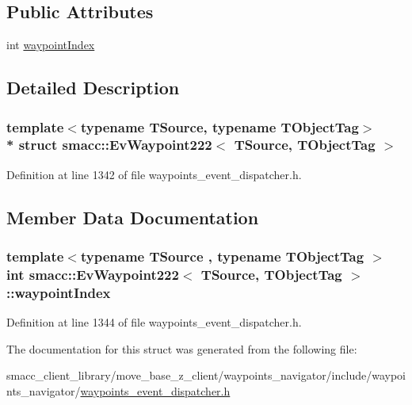 \subsection*{Public Attributes}
\begin{DoxyCompactItemize}
\item 
int \hyperlink{structsmacc_1_1EvWaypoint222_a71aa9cb162e393888c78ec0aecb1785b}{waypoint\+Index}
\end{DoxyCompactItemize}


\subsection{Detailed Description}
\subsubsection*{template$<$typename T\+Source, typename T\+Object\+Tag$>$\\*
struct smacc\+::\+Ev\+Waypoint222$<$ T\+Source, T\+Object\+Tag $>$}



Definition at line 1342 of file waypoints\+\_\+event\+\_\+dispatcher.\+h.



\subsection{Member Data Documentation}
\subsubsection[{\texorpdfstring{waypoint\+Index}{waypointIndex}}]{\setlength{\rightskip}{0pt plus 5cm}template$<$typename T\+Source , typename T\+Object\+Tag $>$ int {\bf smacc\+::\+Ev\+Waypoint222}$<$ T\+Source, T\+Object\+Tag $>$\+::waypoint\+Index}\hypertarget{structsmacc_1_1EvWaypoint222_a71aa9cb162e393888c78ec0aecb1785b}{}\label{structsmacc_1_1EvWaypoint222_a71aa9cb162e393888c78ec0aecb1785b}


Definition at line 1344 of file waypoints\+\_\+event\+\_\+dispatcher.\+h.



The documentation for this struct was generated from the following file\+:\begin{DoxyCompactItemize}
\item 
smacc\+\_\+client\+\_\+library/move\+\_\+base\+\_\+z\+\_\+client/waypoints\+\_\+navigator/include/waypoints\+\_\+navigator/\hyperlink{waypoints__event__dispatcher_8h}{waypoints\+\_\+event\+\_\+dispatcher.\+h}\end{DoxyCompactItemize}
